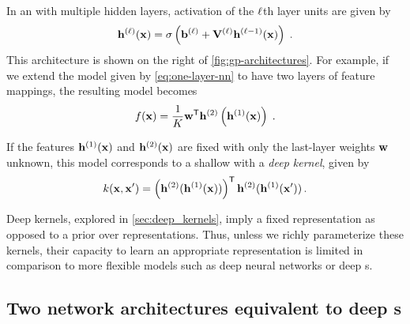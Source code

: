 In an \MLP{} with multiple hidden layers, activation of the $\ell$th layer units are given by
%
\begin{align}
{\bf{h}}^{(\ell)}({\bf{x}}) = \sigma \left( {\bf{b}}^{(\ell)} + \mathbf{V}^{(\ell)} {\bf{h}}^{(\ell-1)}({\bf{x}}) \right) \;.
\label{eq:nextlayer}
\end{align}
This architecture is shown on the right of \cref{fig:gp-architectures}.
%
For example, if we extend the model given by \cref{eq:one-layer-nn} to have two layers of feature mappings, the resulting model becomes
%
\begin{align}
f({\bf{x}}) = \frac{1}{K}{\mathbf {{\bf{w}}}}^{\mathsf{T}} {\bf{h}}^{(2)}\left( {\bf{h}}^{(1)}({\bf{x}}) \right) \;.
\label{eq:mutli-layer-nn}
\end{align}

If the features ${\bf{h}}^{(1)}({\bf{x}})$ and ${\bf{h}}^{(2)}({\bf{x}})$ are fixed with only the last-layer weights ${{\bf{w}}}$ unknown, this model corresponds to a shallow \gp{} with a \emph{deep kernel}, given by
\begin{align}
k({\bf{x}}, {\bf{x}}') = \left( {\bf{h}}^{(2)} ( {\bf{h}}^{(1)}({\bf{x}}) ) \right) ^{\mathsf{T}} {\bf{h}}^{(2)} ({\bf{h}}^{(1)}({\bf{x}}') ) \, .
\end{align}

Deep kernels, explored in \cref{sec:deep_kernels}, imply a fixed representation as opposed to a prior over representations.
Thus, unless we richly parameterize these kernels, their capacity to learn an appropriate representation is limited in comparison to more flexible models such as deep neural networks or deep \gp{}s. %



 
\subsection{Two network architectures equivalent to deep \sgp{}s}

\def\halfshift{0.0cm}

